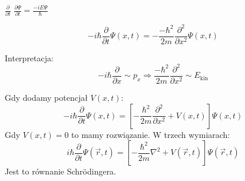 $\frac{\partial}{\partial t}$ $\frac{\partial\Psi}{\partial t} = \frac{-iE\Psi}{\hbar}$

\[
-i\hbar \frac{\partial}{\partial t} \Psi(x, t) = -\frac{-\hbar^2}{2m} \frac{\partial^2}{\partial x^2} \Psi(x, t)
\]

Interpretacja:
\[
-i\hbar \frac{\partial}{\partial x} \sim p_x \Rightarrow \frac{-\hbar^2}{2m} \frac{\partial^2}{\partial x^2} \sim E_{\text{kin}}
\]

Gdy dodamy potencjał $V(x,t)$:
\[
-i\hbar \frac{\partial}{\partial t} \Psi(x,t) = \left[ -\frac{\hbar^2}{2m} \frac{\partial^2}{\partial x^2} + V(x,t) \right] \Psi(x,t)
\]
Gdy $V(x,t) = 0$ to mamy rozwiązanie.
W trzech wymiarach:
\[
i\hbar \frac{\partial}{\partial t} \Psi(\vec{r},t) = \left[ -\frac{\hbar^2}{2m} \nabla^2 + V(\vec{r},t) \right] \Psi(\vec{r},t)
\]
Jest to równanie Schrödingera.
